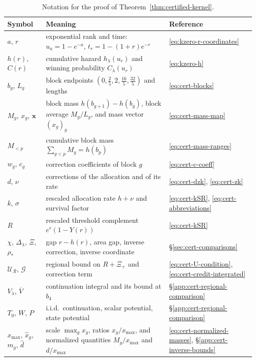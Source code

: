 \documentclass[11pt]{article}
\theoremstyle{definition}
\theoremstyle{remark}
\begin{document}
\begin{table}[htb]
\centering
\small
\begin{tabular}{@{}l p{9.4cm} l@{}}
\toprule
Symbol & Meaning & Reference\\
\midrule
$a$, $r$ & exponential rank and time: $u_a=1-e^{-a}$, $t_r=1-(1+r)e^{-r}$ & \eqref{eq:kzero-r-coordinates}\\
$h(r)$, $C(r)$ & cumulative hazard $h_\lambda(u_r)$ and winning probability $C_\lambda(u_r)$ & \eqref{eq:kzero-h}\\
$b_g$, $L_g$ & block endpoints $(0,\frac25,2,\frac{16}5,\frac{32}5)$ and lengths & \eqref{eq:cert-blocks}\\
$M_g$, $x_g$, $\mathbf x$ & block mass $h(b_{g+1})-h(b_g)$, block average $M_g/L_g$, and mass vector $(x_g)_g$ & \eqref{eq:cert-mass-map}\\
$M_{<p}$ & cumulative block mass $\sum_{g<p}M_g=h(b_p)$ & \eqref{eq:cert-mass-ranges}\\
$w_g$, $c_g$ & correction coefficients of block $g$ & \eqref{eq:cert-c-coeff}\\
$d$, $\nu$ & corrections of the allocation and of its rate & \eqref{eq:cert-dzk}, \eqref{eq:cert-zk}\\
$k$, $\sigma$ & rescaled allocation rate $h+\nu$ and survival factor & \eqref{eq:cert-kSR}, \eqref{eq:cert-abbreviations}\\
$R$ & rescaled threshold complement $e^r(1-Y(r))$ & \eqref{eq:cert-kSR}\\
$\chi$, $\Delta_\lambda$, $\Xi$, $\rho_*$ & gap $r-h(r)$, area gap, inverse correction, inverse coordinate & \S\ref{sec:cert-comparisons}\\
$\mathcal U_{\mathcal R}$, $\mathcal G$ & regional bound on $R+\Xi_+$ and correction term & \eqref{eq:cert-U-condition}, \eqref{eq:cert-credit-integrated}\\
$V_\lambda$, $\overline V$ & continuation integral and its bound at $b_4$ & \S\ref{app:cert-regional-comparison}\\
$T_0$, $W$, $P$ & i.i.d.\ continuation, scalar potential, state potential & \S\ref{app:cert-regional-comparison}\\
$x_{\max}$, $\hat x_g$, $m_g$, $\hat d$ & scale $\max_gx_g$, ratios $x_g/x_{\max}$, and normalized quantities $M_g/x_{\max}$ and $d/x_{\max}$ & \eqref{eq:cert-normalized-masses}, \S\ref{app:cert-inverse-bounds}\\
\bottomrule
\end{tabular}
\caption{Notation for the proof of Theorem~\ref{thm:certified-kernel}.}
\label{tab:cert-notation}
\end{table}
\end{document}
